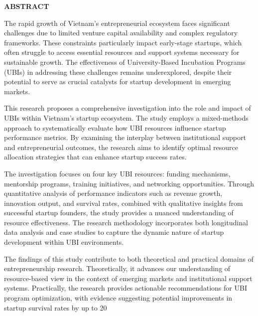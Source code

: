 \documentclass[../DoAn.tex]{subfiles}
\begin{document}
	\begin{center}
		\Large{\textbf{ABSTRACT}}\\
	\end{center}
	\vspace{1cm}
	The rapid growth of Vietnam's entrepreneurial ecosystem faces significant challenges due to limited venture capital availability and complex regulatory frameworks. These constraints particularly impact early-stage startups, which often struggle to access essential resources and support systems necessary for sustainable growth. The effectiveness of University-Based Incubation Programs (UBIs) in addressing these challenges remains underexplored, despite their potential to serve as crucial catalysts for startup development in emerging markets.

	This research proposes a comprehensive investigation into the role and impact of UBIs within Vietnam's startup ecosystem. The study employs a mixed-methods approach to systematically evaluate how UBI resources influence startup performance metrics. By examining the interplay between institutional support and entrepreneurial outcomes, the research aims to identify optimal resource allocation strategies that can enhance startup success rates.

	The investigation focuses on four key UBI resources: funding mechanisms, mentorship programs, training initiatives, and networking opportunities. Through quantitative analysis of performance indicators such as revenue growth, innovation output, and survival rates, combined with qualitative insights from successful startup founders, the study provides a nuanced understanding of resource effectiveness. The research methodology incorporates both longitudinal data analysis and case studies to capture the dynamic nature of startup development within UBI environments.

	The findings of this study contribute to both theoretical and practical domains of entrepreneurship research. Theoretically, it advances our understanding of resource-based view in the context of emerging markets and institutional support systems. Practically, the research provides actionable recommendations for UBI program optimization, with evidence suggesting potential improvements in startup survival rates by up to 20%
\end{document}
